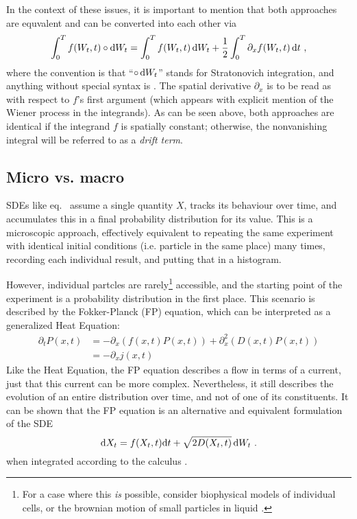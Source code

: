 %
In the context of these issues, it is important to mention that both approaches are equvalent and can be converted into each other via
%
\begin{equation}
	\int_0^Tf(W_t,t)\circ\mathrm{d} W_t
	=
	\int_0^Tf(W_t,t)\,\mathrm{d} W_t
	+
	\frac12\int_0^T \partial_xf(W_t,t)\,\mathrm{d} t ~,
\end{equation}
%
where the convention is that ``\(\circ\,\mathrm{d} W_t\)'' stands for Stratonovich integration, and anything without special syntax is \Ito{}. The spatial derivative \(\partial_x\) is to be read as with respect to \(f\)'s first argument (which appears with explicit mention of the Wiener process in the integrands). As can be seen above, both approaches are identical if the integrand \(f\) is spatially constant; otherwise, the nonvanishing integral will be referred to as a \emph{drift term}.


\subsection{Micro vs. macro}
\label{sec:fp introduction}

SDEs like eq.~ assume a single quantity \(X\), tracks its behaviour over time, and accumulates this in a final probability distribution for its value. This is a microscopic approach, effectively equivalent to repeating the same experiment with identical initial conditions (i.e. particle in the same place) many times, recording each individual result, and putting that in a histogram.

However, individual partcles are rarely\footnote{For a case where this \emph{is} possible, consider biophysical models of individual cells, or the brownian motion of small particles in liquid \cite{sengupta}.} accessible, and the starting point of the experiment is a probability distribution in the first place. This scenario is described by the Fokker-Planck (FP) equation, which can be interpreted as a generalized Heat Equation:
%
\begin{equation}
	\label{eqn:fp}
	\begin{split}
	\partial_tP(x,t)
	&= - \partial_x (f(x,t)P(x,t)) + \partial_x^2 (D(x,t)P(x,t)) \\
	&= -\partial_xj(x,t)
	\end{split}
\end{equation}
%
Like the Heat Equation, the FP equation describes a flow in terms of a current, just that this current can be more complex. Nevertheless, it still describes the evolution of an entire distribution over time, and not of one of its constituents. It can be shown that the FP equation is an alternative and equivalent formulation of the SDE
%
\begin{equation}
	\mathrm{d} X_t = f(X_t,t)\mathrm{d} t + \sqrt{2 D(X_t,t)}\,\mathrm{d} W_t ~.
\end{equation}
%
when integrated according to the \Ito{} calculus \cite{sde}.




